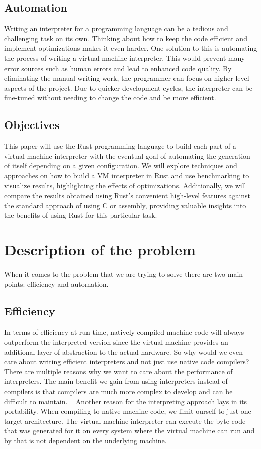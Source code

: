 \documentclass{article}
\begin{document}
\subsection{Automation}
Writing an interpreter for a programming language can be a tedious and
challenging task on its own. Thinking about how to keep the code efficient and
implement optimizations makes it even harder.
One solution to this is automating the process of writing a virtual machine
interpreter. This would prevent many error sources such as human errors and
lead to enhanced code quality. By eliminating the manual writing work, the
programmer can focus on higher-level aspects of the project. Due to quicker
development cycles, the interpreter can be fine-tuned without needing to change
the code and be more efficient.

\subsection{Objectives} 
This paper will use the Rust programming language to build each part of a
virtual machine interpreter with the eventual goal of automating the generation
of itself depending on a given configuration. We will explore techniques and
approaches on how to build a VM interpreter in Rust and use benchmarking to
visualize results, highlighting the effects of optimizations. Additionally, we
will compare the results obtained using Rust's convenient high-level features
against the standard approach of using C or assembly, providing valuable
insights into the benefits of using Rust for this particular task.

\section{Description of the problem}
When it comes to the problem that we are trying to solve there are two main
points: efficiency and automation.

\subsection{Efficiency}
In terms of efficiency at run time, natively compiled machine code will always
outperform the interpreted version since the virtual machine provides an
additional layer of abstraction to the actual hardware. So why would we even
care about writing efficient interpreters and not just use native code
compilers? There are multiple reasons why we want to care about the performance
of interpreters. The main benefit we gain from using interpreters instead of
compilers is that compilers are much more complex to develop and can be
difficult to maintain. ~\cite{structure_and_performance} Another reason for the
interpreting approach lays in its portability. When compiling to native machine
code, we limit ourself to just one target architecture. The virtual machine
interpreter can execute the byte code that was generated for it on every system
where the virtual machine can run and by that is not dependent on the
underlying machine.
\end{document}
